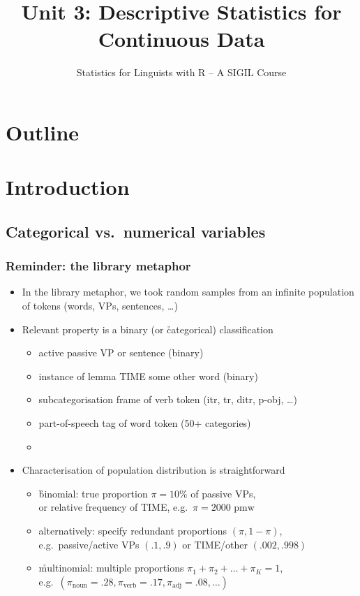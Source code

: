 \documentclass[t]{beamer} %
\title[3a.\ Continuous Data: Description]{Unit 3: Descriptive Statistics for Continuous Data}
\subtitle{Statistics for Linguists with R -- A SIGIL Course}
\begin{document}
\frame{\titlepage}


\section*{Outline}

\section{Introduction}

\subsection{Categorical vs.\ numerical variables}

\begin{frame}
  \frametitle{Reminder: the library metaphor}

  \begin{itemize}
  \item In the library metaphor, we took random samples from an infinite
    population of tokens (words, VPs, sentences, \ldots)
  \item Relevant property is a binary (or \h{categorical}) classification
    \begin{itemize}
    \item active \vs passive VP or sentence (binary)
    \item instance of lemma TIME \vs some other word (binary)
    \item subcategorisation frame of verb token (itr, tr, ditr, p-obj, \ldots)
    \item part-of-speech tag of word token (50+ categories)
    \item[]
    \end{itemize}
    \pause
  \item Characterisation of population distribution is straightforward
    \begin{itemize}
    \item \h{binomial}: true proportion $\pi = 10\%$ of passive VPs,\\
      or relative frequency of TIME, e.g.\ $\pi = 2000\text{ pmw}$
    \item alternatively: specify redundant proportions $(\pi, 1-\pi)$,\\
      e.g.\ passive/active VPs $(.1, .9)$ or TIME/other $(.002, .998)$
    \item \h{multinomial}: multiple proportions $\pi_1 + \pi_2 + \dots + \pi_K
      = 1$,\\
      e.g.\ $(\pi_{\text{noun}} = .28, \pi_{\text{verb}} = .17, \pi_{\text{adj}} = .08, \ldots)$
    \end{itemize}
  \end{itemize}
\end{frame}
\end{document}
